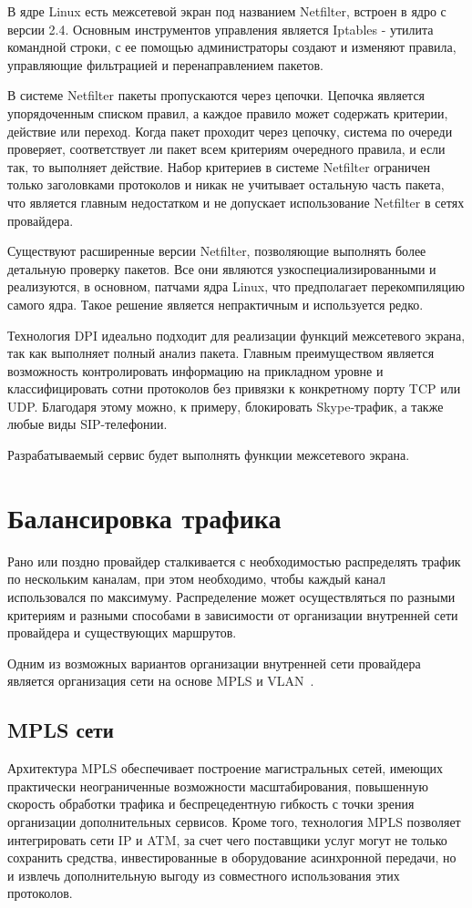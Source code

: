 В ядре Linux есть межсетевой экран под названием Netfilter, встроен в ядро с версии 2.4. Основным инструментов управления является Iptables - утилита командной строки, с ее помощью администраторы создают и изменяют правила, управляющие фильтрацией и перенаправлением пакетов.

В системе Netfilter пакеты пропускаются через цепочки. Цепочка является упорядоченным списком правил, а каждое правило может содержать критерии, действие или переход. Когда пакет проходит через цепочку, система по очереди проверяет, соответствует ли пакет всем критериям очередного правила, и если так, то выполняет действие. Набор критериев в системе Netfilter ограничен только заголовками протоколов и никак не учитывает остальную часть пакета, что является главным недостатком и не допускает использование Netfilter в сетях провайдера.

Существуют расширенные версии Netfilter, позволяющие выполнять более детальную проверку пакетов. Все они являются узкоспециализированными и реализуются, в основном, патчами ядра Linux, что предполагает перекомпиляцию самого ядра. Такое решение является непрактичным и используется редко.

Технология DPI идеально подходит для реализации функций межсетевого экрана, так как выполняет полный анализ пакета. Главным преимуществом является возможность контролировать информацию на прикладном уровне и классифицировать сотни протоколов без привязки к конкретному порту TCP или UDP. Благодаря этому можно, к примеру, блокировать Skype-трафик, а также любые виды SIP-телефонии.

Разрабатываемый сервис будет выполнять функции межсетевого экрана.


\section{Балансировка трафика}
Рано или поздно провайдер сталкивается с необходимостью распределять трафик по нескольким каналам, при этом необходимо, чтобы каждый канал использовался по максимуму. Распределение может осуществляться по разными критериям и разными способами в зависимости от организации внутренней сети провайдера и существующих маршрутов.

Одним из возможных вариантов организации внутренней сети провайдера является организация сети на основе MPLS и VLAN~\cite{modern_net}.

\subsection{MPLS сети}
Архитектура MPLS обеспечивает построение магистральных сетей, имеющих практически неограниченные возможности масштабирования, повышенную скорость обработки трафика и беспрецедентную гибкость с точки зрения организации дополнительных сервисов. Кроме того, технология MPLS позволяет интегрировать сети IP и ATM, за счет чего поставщики услуг могут не только сохранить средства, инвестированные в оборудование асинхронной передачи, но и извлечь дополнительную выгоду из совместного использования этих протоколов.

